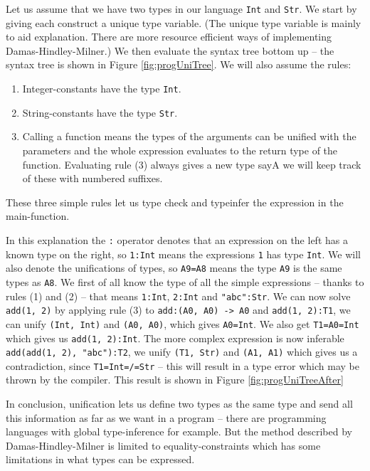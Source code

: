 Let us assume that we have two types in our language \verb+Int+ and \verb+Str+. We start by giving each construct a unique type variable. (The unique type variable is mainly to aid explanation. There are more resource efficient ways of implementing Damas-Hindley-Milner.) We then evaluate the syntax tree bottom up -- the syntax tree is shown in Figure \ref{fig:progUniTree}. We will also assume the rules: 
\begin{enumerate}
  \item Integer-constants have the type \verb+Int+.
  \item String-constants have the type \verb+Str+.
  \item Calling a function means the types of the arguments can be unified with the parameters and the whole expression evaluates to the return type of the function. Evaluating rule (3) always gives a new type say{A} we will keep track of these with numbered suffixes.
\end{enumerate}
These three simple rules let us type check and typeinfer the expression in the main-function.

In this explanation the \verb+:+ operator denotes that an expression on the left has a known type on the right, so \verb+1:Int+ means the expressions \verb+1+ has type \verb+Int+. We will also denote the unifications of types, so \verb+A9=A8+ means the type \verb+A9+ is the same types as \verb+A8+. We first of all know the type of all the simple expressions -- thanks to rules (1) and (2) -- that means \verb+1:Int+, \verb+2:Int+ and \verb+"abc":Str+. We can now solve \verb+add(1, 2)+ by applying rule (3) to \verb+add:(A0, A0) -> A0+ and \verb+add(1, 2):T1+, we can unify \verb+(Int, Int)+ and \verb+(A0, A0)+, which gives \verb+A0=Int+. We also get \verb+T1=A0=Int+ which gives us \verb+add(1, 2):Int+. The more complex expression is now inferable \verb+add(add(1, 2), "abc"):T2+, we unify \verb+(T1, Str)+ and \verb+(A1, A1)+ which gives us a contradiction, since \verb+T1=Int=/=Str+ -- this will result in a type error which may be thrown by the compiler. This result is shown in Figure \ref{fig:progUniTreeAfter}

In conclusion, unification lets us define two types as the same type and send all this information as far as we want in a program -- there are programming languages with global type-inference for example. But the method described by Damas-Hindley-Milner is limited to equality-constraints which has some limitations in what types can be expressed.

